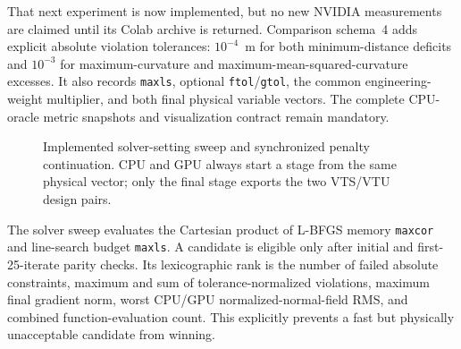 \documentclass[11pt,a4paper]{article}
\newcommand{\code}[1]{\texttt{#1}}
\begin{document}
That next experiment is now implemented, but no new NVIDIA measurements are
claimed until its Colab archive is returned.  Comparison schema~4 adds explicit
absolute violation tolerances: $10^{-4}$~m for both minimum-distance deficits
and $10^{-3}$ for maximum-curvature and maximum-mean-squared-curvature excesses.
It also records \code{maxls}, optional \code{ftol}/\code{gtol}, the common
engineering-weight multiplier, and both final physical variable vectors.  The
complete CPU-oracle metric snapshots and visualization contract remain
mandatory.

\begin{figure}[htbp]
\centering
{}
\caption{Implemented solver-setting sweep and synchronized penalty
continuation.  CPU and GPU always start a stage from the same physical vector;
only the final stage exports the two VTS/VTU design pairs.}
\label{fig:feasibility-workflow}
\end{figure}

The solver sweep evaluates the Cartesian product of L-BFGS memory
\code{maxcor} and line-search budget \code{maxls}.  A candidate is eligible only
after initial and first-25-iterate parity checks.  Its lexicographic rank is the
number of failed absolute constraints, maximum and sum of tolerance-normalized
violations, maximum final gradient norm, worst CPU/GPU normalized-normal-field
RMS, and combined function-evaluation count.  This explicitly prevents a fast
but physically unacceptable candidate from winning.
\end{document}

